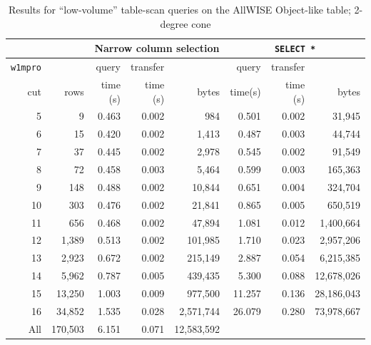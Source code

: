 \begin{table}[h]
\centering
\begin{tabular}{r r r r r r r r}
 & & \multicolumn{3}{c}{Narrow column selection} & \multicolumn{3}{c}{\texttt{SELECT *}} \\ \hline
\texttt{w1mpro} &  & query & transfer &  & query & transfer &  \\
cut & rows & time (s) & time (s) & bytes & time(s) & time (s) & bytes \\ \hline
5 & 9 & 0.463 & 0.002 & 984 & 0.501 & 0.002 & 31,945 \\
6 & 15 & 0.420 & 0.002 & 1,413 & 0.487 & 0.003 & 44,744 \\
7 & 37 & 0.445 & 0.002 & 2,978 & 0.545 & 0.002 & 91,549 \\
8 & 72 & 0.458 & 0.003 & 5,464 & 0.599 & 0.003 & 165,363 \\
9 & 148 & 0.488 & 0.002 & 10,844 & 0.651 & 0.004 & 324,704 \\
10 & 303 & 0.476 & 0.002 & 21,841 & 0.865 & 0.005 & 650,519 \\
11 & 656 & 0.468 & 0.002 & 47,894 & 1.081 & 0.012 & 1,400,664 \\
12 & 1,389 & 0.513 & 0.002 & 101,985 & 1.710 & 0.023 & 2,957,206 \\
13 & 2,923 & 0.672 & 0.002 & 215,149 & 2.887 & 0.054 & 6,215,385 \\
14 & 5,962 & 0.787 & 0.005 & 439,435 & 5.300 & 0.088 & 12,678,026 \\
15 & 13,250 & 1.003 & 0.009 & 977,500 & 11.257 & 0.136 & 28,186,043 \\
16 & 34,852 & 1.535 & 0.028 & 2,571,744 & 26.079 & 0.280 & 73,978,667 \\
All & 170,503 & 6.151 & 0.071 & 12,583,592 \\
\end{tabular}
\caption{Results for ``low-volume'' table-scan queries on the AllWISE Object-like table; 2-degree cone}
\label{tab:lsp-00-10-2-degree-scans}
\end{table}



